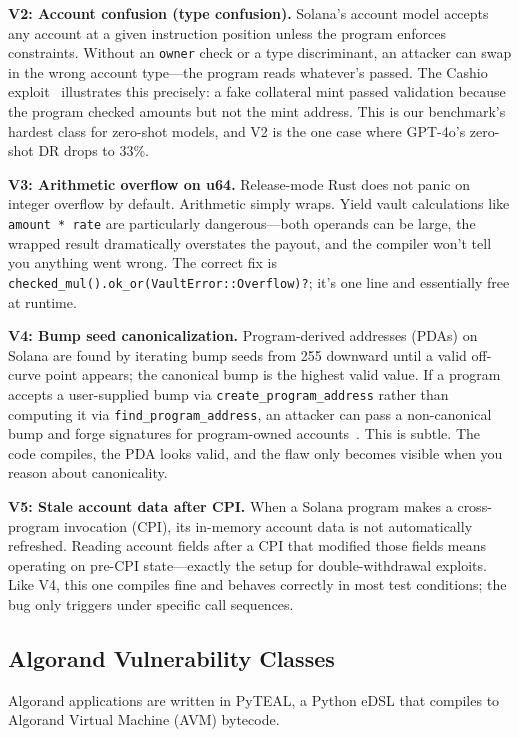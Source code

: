\documentclass[journal]{IEEEtran}
\begin{document}
\textbf{V2: Account confusion (type confusion).}
Solana's account model accepts any account at a given instruction position
unless the program enforces constraints.
Without an \texttt{owner} check or a type discriminant, an attacker can
swap in the wrong account type---the program reads whatever's passed.
The Cashio exploit~\cite{halborn2022cashio} illustrates this precisely:
a fake collateral mint passed validation because the program checked amounts
but not the mint address.
This is our benchmark's hardest class for zero-shot models, and V2 is the one
case where GPT-4o's zero-shot DR drops to 33\%.

\textbf{V3: Arithmetic overflow on u64.}
Release-mode Rust does not panic on integer overflow by default.
Arithmetic simply wraps.
Yield vault calculations like \texttt{amount * rate} are particularly
dangerous---both operands can be large, the wrapped result dramatically
overstates the payout, and the compiler won't tell you anything went wrong.
The correct fix is \texttt{checked\_mul().ok\_or(VaultError::Overflow)?};
it's one line and essentially free at runtime.

\textbf{V4: Bump seed canonicalization.}
Program-derived addresses (PDAs) on Solana are found by iterating
bump seeds from 255 downward until a valid off-curve point appears;
the canonical bump is the highest valid value.
If a program accepts a user-supplied bump via \texttt{create\_program\_address}
rather than computing it via \texttt{find\_program\_address}, an attacker
can pass a non-canonical bump and forge signatures for program-owned
accounts~\cite{ferrante2022sealevel}.
This is subtle. The code compiles, the PDA looks valid, and the flaw only
becomes visible when you reason about canonicality.

\textbf{V5: Stale account data after CPI.}
When a Solana program makes a cross-program invocation (CPI), its in-memory
account data is not automatically refreshed.
Reading account fields after a CPI that modified those fields means operating
on pre-CPI state---exactly the setup for double-withdrawal exploits.
Like V4, this one compiles fine and behaves correctly in most test conditions;
the bug only triggers under specific call sequences.

\subsection{Algorand Vulnerability Classes}

Algorand applications are written in PyTEAL, a Python eDSL that compiles to
Algorand Virtual Machine (AVM) bytecode.
\end{document}
